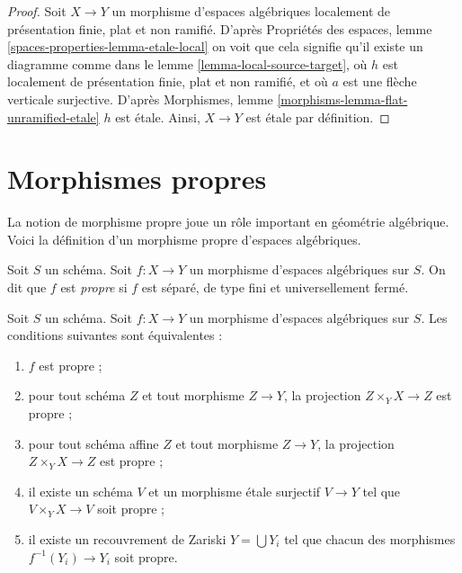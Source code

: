 \begin{proof}
Soit $X \to Y$ un morphisme d'espaces algébriques localement de présentation
finie, plat et non ramifié. D'après
Propriétés des espaces, lemme \ref{spaces-properties-lemma-etale-local}
on voit que cela signifie qu'il existe un diagramme comme dans le
lemme \ref{lemma-local-source-target},
où $h$ est localement de présentation finie, plat et non ramifié,
et où $a$ est une flèche verticale surjective. D'après
Morphismes, lemme \ref{morphisms-lemma-flat-unramified-etale}
$h$ est étale. Ainsi, $X \to Y$ est étale par définition.
\end{proof}






\section{Morphismes propres}
\label{section-proper}

\noindent
La notion de morphisme propre joue un rôle important en géométrie algébrique.
Voici la définition d'un morphisme propre d'espaces algébriques.

\begin{definition}
\label{definition-proper}
Soit $S$ un schéma.
Soit $f : X \to Y$ un morphisme d'espaces algébriques sur $S$.
On dit que $f$ est {\it propre} si $f$ est séparé, de type fini et
universellement fermé.
\end{definition}

\begin{lemma}
\label{lemma-proper-local}
Soit $S$ un schéma. Soit $f : X \to Y$ un morphisme d'espaces algébriques
sur $S$. Les conditions suivantes sont équivalentes :
\begin{enumerate}
\item $f$ est propre ;
\item pour tout schéma $Z$ et tout morphisme $Z \to Y$,
la projection $Z \times_Y X \to Z$ est propre ;
\item pour tout schéma affine $Z$ et tout morphisme $Z \to Y$,
la projection $Z \times_Y X \to Z$ est propre ;
\item il existe un schéma $V$ et un morphisme étale surjectif
$V \to Y$ tel que $V \times_Y X \to V$ soit propre ;
\item il existe un recouvrement de Zariski $Y = \bigcup Y_i$ tel que
chacun des morphismes $f^{-1}(Y_i) \to Y_i$ soit propre.
\end{enumerate}
\end{lemma}

